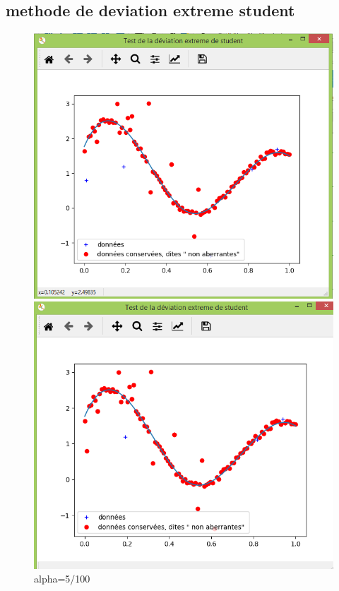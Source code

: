 \documentclass[11pt]{report}
\begin{document}
\subsection*{methode de deviation extreme student}
 \begin{figure}[!htb] %
\includegraphics[width=\linewidth]{extn.PNG} %
\caption{alpha=5/100} %
\label{alpha1995} %
\endminipage
{}%
\includegraphics[width=\linewidth]{ext005.PNG}  

\end{figure}
\end{document}
